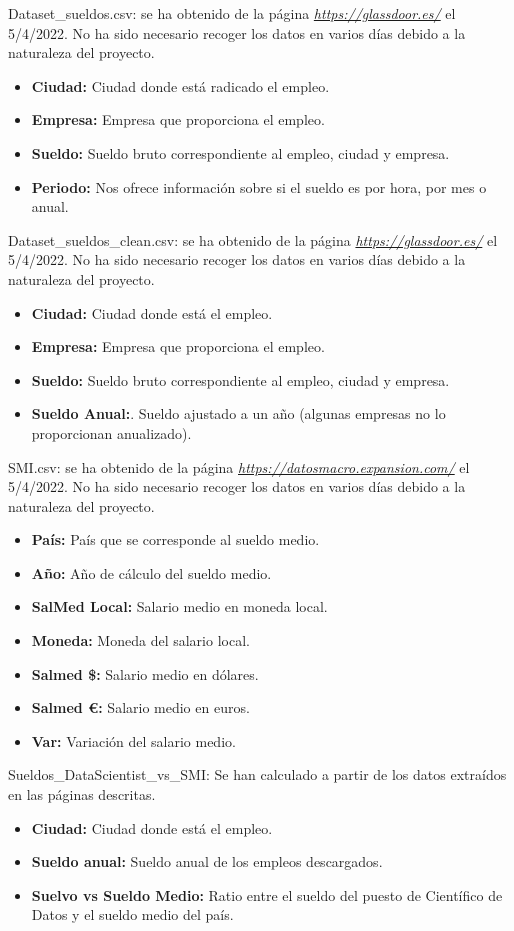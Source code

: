 \documentclass[IB]{PlantillaPACnova_Est}
\begin{document}
Dataset\_sueldos.csv: se ha obtenido de la página  \textit{\url{https://glassdoor.es/}} el 5/4/2022. No ha sido necesario recoger los datos en varios días debido a la naturaleza del proyecto.
\begin{itemize}
\item \textbf{Ciudad:} Ciudad donde está radicado el empleo.
\item \textbf{Empresa:} Empresa que proporciona el empleo.
\item \textbf{Sueldo:} Sueldo bruto correspondiente al empleo, ciudad y empresa.
\item \textbf{Periodo:} Nos ofrece información sobre si el sueldo es por hora, por mes o anual.
\end{itemize}

Dataset\_sueldos\_clean.csv: se ha obtenido de la página  \textit{\url{https://glassdoor.es/}} el 5/4/2022. No ha sido necesario recoger los datos en varios días debido a la naturaleza del proyecto.
\begin{itemize}
\item \textbf{Ciudad: } Ciudad donde está el empleo.
\item \textbf{Empresa:} Empresa que proporciona el empleo.
\item \textbf{Sueldo:} Sueldo bruto correspondiente al empleo, ciudad y empresa.
\item \textbf{Sueldo Anual:}. Sueldo ajustado a un año (algunas empresas no lo proporcionan anualizado).
\end{itemize}

SMI.csv: se ha obtenido de la página  \textit{\url{https://datosmacro.expansion.com/}} el 5/4/2022. No ha sido necesario recoger los datos en varios días debido a la naturaleza del proyecto.
\begin{itemize}
\item \textbf{País: }País que se corresponde al sueldo medio.
\item \textbf{Año: }Año de cálculo del sueldo medio.
\item \textbf{SalMed Local: }Salario medio en moneda local.
\item \textbf{Moneda:} Moneda del salario local.
\item \textbf{Salmed \$:} Salario medio en dólares.
\item \textbf{Salmed €:} Salario medio en euros.
\item \textbf{Var:} Variación del salario medio.
\end{itemize}
\newpage
Sueldos\_DataScientist\_vs\_SMI: Se han calculado a partir de los datos extraídos en las páginas descritas.
\begin{itemize}
\item \textbf{Ciudad:}  Ciudad donde está el empleo.
\item \textbf{Sueldo anual:} Sueldo anual de los empleos descargados.
\item \textbf{Suelvo vs Sueldo Medio: }Ratio entre el sueldo del puesto de Científico de Datos y el sueldo medio del país.
\end{itemize}
\end{document}
